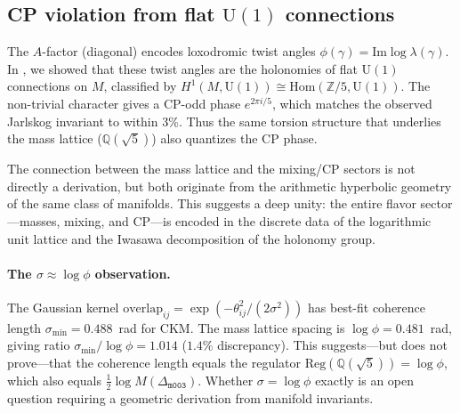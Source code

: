 ﻿\documentclass[12pt]{article}
\theoremstyle{definition}
\begin{document}
\subsection{CP violation from flat $\mathrm{U}(1)$ connections}
The $A$-factor (diagonal) encodes loxodromic twist angles $\phi(\gamma)=\mathrm{Im}\log\lambda(\gamma)$. In \cite{Gentry:CP}, we showed that these twist angles are the holonomies of flat $\mathrm{U}(1)$ connections on $M$, classified by $H^1(M,\mathrm{U}(1))\cong\mathrm{Hom}(\mathbb{Z}/5,\mathrm{U}(1))$. The non-trivial character gives a CP-odd phase $e^{2\pi i/5}$, which matches the observed Jarlskog invariant to within $3\%$. Thus the same torsion structure that underlies the mass lattice ($\mathbb{Q}(\sqrt5)$) also quantizes the CP phase.

The connection between the mass lattice and the mixing/CP sectors is not directly a derivation, but both originate from the arithmetic hyperbolic geometry of the same class of manifolds. This suggests a deep unity: the entire flavor sector---masses, mixing, and CP---is encoded in the discrete data of the logarithmic unit lattice and the Iwasawa decomposition of the holonomy group.




\paragraph{The $\sigma\approx\log\phi$ observation.}
The Gaussian kernel
$\mathrm{overlap}_{ij}=\exp(-\theta_{ij}^2/(2\sigma^2))$
has best-fit coherence length $\sigma_{\min}=0.488$~rad for CKM.
The mass lattice spacing is $\log\phi=0.481$~rad, giving ratio
$\sigma_{\min}/\log\phi=1.014$ ($1.4\%$ discrepancy).
This suggests---but does not prove---that the coherence length
equals the regulator $\mathrm{Reg}(\mathbb{Q}(\sqrt5))=\log\phi$,
which also equals $\tfrac{1}{2}\log M(\Delta_{\texttt{m003}})$.
Whether $\sigma=\log\phi$ exactly is an open question requiring
a geometric derivation from manifold invariants.
\end{document}
